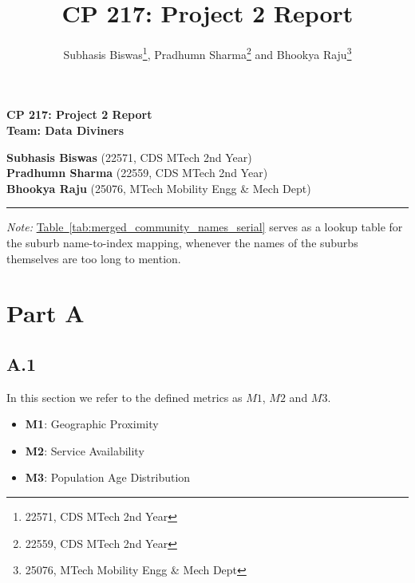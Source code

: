 \documentclass[
	a4paper, %
	10pt, %
	unnumberedsections, %
	twoside, %
]{LTJournalArticle}
\title{CP 217: Project 2 Report} %
\author{%
	Subhasis Biswas\thanks{22571, CDS MTech 2nd Year},  Pradhumn Sharma\thanks{22559, CDS MTech 2nd Year} and Bhookya Raju\thanks{25076, MTech Mobility Engg \& Mech Dept}
}
\begin{document}

\begin{center}
  \textbf{\Large CP 217: Project 2 Report} \\[1em]
  \textbf{Team: Data Diviners} \\[2em]
\end{center}
\vspace{-8pt}
\textbf{Subhasis Biswas} \> (22571, CDS MTech 2nd Year) \\
\textbf{Pradhumn Sharma} \> (22559, CDS MTech 2nd Year) \\
\textbf{Bhookya Raju} \> (25076, MTech Mobility Engg \& Mech Dept) \\

\vspace{-5pt}
\hrule\leavevmode


\vspace{-3pt}

\begin{small}
  \textit{Note:} \hyperref[tab:merged_community_names_serial]{Table~\ref{tab:merged_community_names_serial}} serves as a lookup table for the suburb name-to-index mapping, whenever the names of the suburbs themselves are too long to mention.
\end{small}

\section{Part A}



\subsection{A.1}

In this section we refer to the defined metrics as $M1$, $M2$ and $M3$.
\begin{itemize}
    \item \textbf{M1}: Geographic Proximity
    \item \textbf{M2}: Service Availability
    \item \textbf{M3}: Population Age Distribution
\end{itemize}
\end{document}
